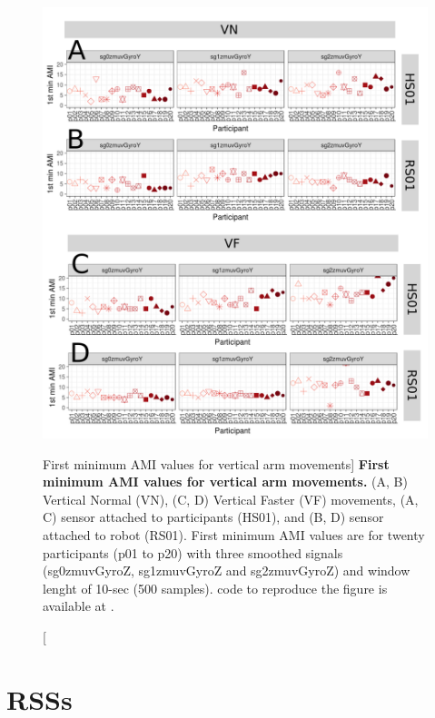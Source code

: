 \begin{figure}
\centering
\includegraphics[width=1.0\textwidth]{ami_aVw10}
	\caption
	[First minimum AMI values for vertical arm movements]{
	{\bf First minimum AMI values for vertical arm movements.}
		(A, B) Vertical Normal (VN), (C, D) Vertical Faster (VF) 
		movements,
		(A, C) sensor attached to participants (HS01), and
		(B, D) sensor attached to robot (RS01).
		First minimum AMI values are for twenty participants 
		(p01 to p20) with three smoothed signals (sg0zmuvGyroZ, 
		sg1zmuvGyroZ and sg2zmuvGyroZ) and  window lenght of 
		10-sec (500 samples).
	\R code to reproduce the figure is available at 
	.
        }
    \label{fig:amiV}
\end{figure}




\newpage
\section{RSSs} \label{appendix:e:rsss}

